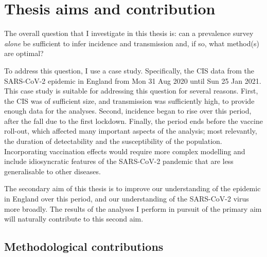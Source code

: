 \documentclass[thesis.tex]{subfiles}
\begin{document}


\section{Thesis aims and contribution} \label{intro:sec:aims}

The overall question that I investigate in this thesis is: can a prevalence survey \emph{alone} be sufficient to infer incidence and transmission and, if so, what method(s) are optimal?

To address this question, I use a case study.
Specifically, the CIS data from the SARS-CoV-2 epidemic in England from Mon 31 Aug 2020 until Sun 25 Jan 2021.
This case study is suitable for addressing this question for several reasons.
First, the CIS was of sufficient size, and transmission was sufficiently high, to provide enough data for the analyses.
Second, incidence began to rise over this period, after the fall due to the first lockdown.
Finally, the period ends before the vaccine roll-out, which  affected many important aspects of the analysis; most relevantly, the duration of detectability and the susceptibility of the population.
Incorporating vaccination effects would require more complex modelling and include idiosyncratic features of the SARS-CoV-2 pandemic that are less generalisable to other diseases.

The secondary aim of this thesis is to improve our understanding of the epidemic in England over this period, and our understanding of the SARS-CoV-2 virus more broadly.
The results of the analyses I perform in pursuit of the primary aim will naturally contribute to this second aim.

\subsection{Methodological contributions}
\end{document}

